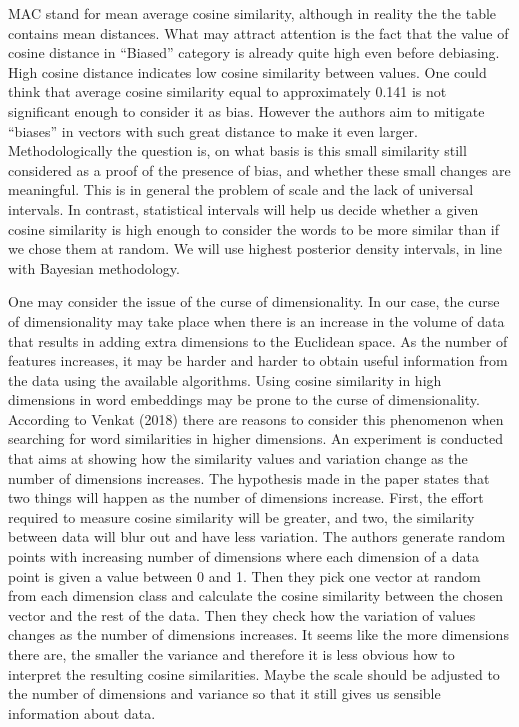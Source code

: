 \documentclass[
  10pt,
  dvipsnames,enabledeprecatedfontcommands]{scrartcl}
\begin{document}
MAC stand for mean average cosine similarity, although in reality the
the table contains mean distances. What may attract attention is the
fact that the value of cosine distance in ``Biased'' category is already
quite high even before debiasing. High cosine distance indicates low
cosine similarity between values. One could think that average cosine
similarity equal to approximately 0.141 is not significant enough to
consider it as bias. However the authors aim to mitigate ``biases'' in
vectors with such great distance to make it even larger.
Methodologically the question is, on what basis is this small similarity
still considered as a proof of the presence of bias, and whether these
small changes are meaningful. This is in general the problem of scale
and the lack of universal intervals. In contrast, statistical intervals
will help us decide whether a given cosine similarity is high enough to
consider the words to be more similar than if we chose them at random.
We will use highest posterior density intervals, in line with Bayesian
methodology.

One may consider the issue of the curse of dimensionality. In our case,
the curse of dimensionality may take place when there is an increase in
the volume of data that results in adding extra dimensions to the
Euclidean space. As the number of features increases, it may be harder
and harder to obtain useful information from the data using the
available algorithms. Using cosine similarity in high dimensions in word
embeddings may be prone to the curse of dimensionality. According to
Venkat (2018) there are reasons to consider this phenomenon when
searching for word similarities in higher dimensions. An experiment is
conducted that aims at showing how the similarity values and variation
change as the number of dimensions increases. The hypothesis made in the
paper states that two things will happen as the number of dimensions
increase. First, the effort required to measure cosine similarity will
be greater, and two, the similarity between data will blur out and have
less variation. The authors generate random points with increasing
number of dimensions where each dimension of a data point is given a
value between 0 and 1. Then they pick one vector at random from each
dimension class and calculate the cosine similarity between the chosen
vector and the rest of the data. Then they check how the variation of
values changes as the number of dimensions increases. It seems like the
more dimensions there are, the smaller the variance and therefore it is
less obvious how to interpret the resulting cosine similarities. Maybe
the scale should be adjusted to the number of dimensions and variance so
that it still gives us sensible information about data.
\end{document}
